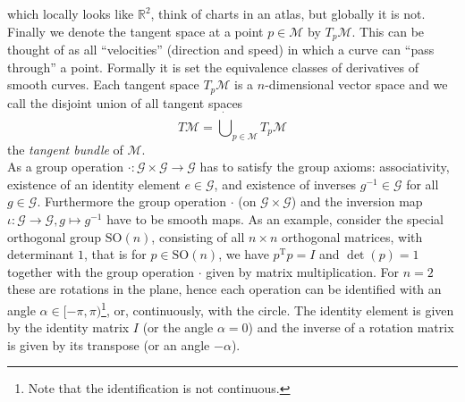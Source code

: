 \documentclass{juliacon}
\newcommand{\term}[1]{\emph{#1}}
\begin{document}
which locally looks like \(\mathbb{R}^2\), think of charts in an atlas, but globally it is not.
Finally we denote the tangent space at a point \(p \in \mathcal{M}\) by \(T_p\mathcal{M}\). This can be thought of as all “velocities” (direction and speed) in which a curve can “pass through” a point. Formally it is set the equivalence classes of derivatives of smooth curves. Each tangent space $T_p\mathcal M$ is a $n$-dimensional vector space and we call the disjoint union of all tangent spaces
\begin{equation*}
    T\mathcal M = \dot\bigcup_{p \in \mathcal M} T_p\mathcal M
\end{equation*}
the \term{tangent bundle} of $\mathcal M$.
\\
As a group operation \(\cdot\colon\mathcal{G} \times \mathcal{G} \to \mathcal{G}\) has to satisfy the group axioms: associativity, existence of an identity element \(e \in \mathcal{G}\), and existence of inverses \(g^{-1} \in \mathcal{G}\) for all \(g \in \mathcal{G}\). Furthermore the group operation \(\cdot\) (on \( \mathcal{G}\times\mathcal{G} \)) and the inversion map \(\iota\colon\mathcal{G} \to \mathcal{G}, g \mapsto g^{-1}\) have to be smooth maps.
As an example, consider the special orthogonal group \(\mathrm{SO}(n)\), consisting of all \(n \times n\) orthogonal matrices, with determinant \(1\), that is for \(p\in \mathrm{SO}(n)\), we have \(p^{\mathrm{T}} p = I\) and \(\det(p) = 1\) together with the group operation \(\cdot\) given by matrix multiplication.
For $n=2$ these are rotations in the plane, hence each operation can be identified with an angle $\alpha \in [-\pi, \pi)$\footnote{Note that the identification is not continuous.}, or, continuously, with the circle. %
The identity element is given by the identity matrix \(I\) (or the angle $\alpha=0$) and the inverse of a rotation matrix is given by its transpose (or an angle $-\alpha$). %
\end{document}
